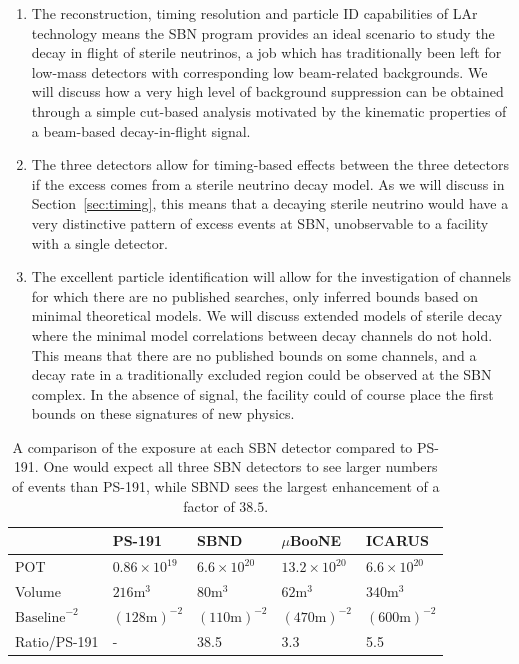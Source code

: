 \documentclass[11pt, a4paper]{article}
\newcommand{\refsec}[1]{Section~\ref{#1}}
\begin{document}
\begin{enumerate}

\item The reconstruction, timing resolution and particle ID capabilities of LAr technology means
the SBN program provides an ideal scenario to study the decay in flight of
sterile neutrinos, a job which has traditionally been left for low-mass
detectors with corresponding low beam-related backgrounds. 
%
We will discuss how a very high level of background suppression can be obtained
through a simple cut-based analysis motivated by the kinematic properties
of a beam-based decay-in-flight signal. 

\item The three detectors allow for timing-based effects between 
the three detectors if the excess comes from a sterile neutrino decay 
model. As we will discuss in \refsec{sec:timing}, this means that a decaying 
sterile neutrino would have a very distinctive pattern of excess events at
SBN, unobservable to a facility with a single detector.

\item The excellent particle identification will allow for the investigation of
channels for which there are no published searches, only inferred bounds based
on minimal theoretical models. We will discuss extended models of sterile decay
where the minimal model correlations between decay channels do not hold. This
means that there are no published bounds on some channels, and a decay rate in
a traditionally excluded region could be observed at the SBN complex. In the
absence of signal, the facility could of course place the first bounds on these
signatures of new physics.

\end{enumerate} 

\begin{table}[t!]
\centering
\begin{tabular}{| l || l | l | l | l |}
	\hline
	& PS-191 & SBND & $\mu$BooNE & ICARUS \\ \hline \hline
	POT	& $0.86 \times 10^{19}$	& $6.6 \times 10^{20}$	&	$13.2 \times 10^{20}$     &  $6.6 \times 10^{20}$ \\ \hline
	Volume	& $216\text{m}^3$	&	$80\text{m}^3$	&	$62\text{m}^3$	     &   $340\text{m}^3$	\\ \hline
	$\text{Baseline}^{-2}$	& $(128 	\text{m} )^{-2}$	&$(110 \text{m} )^{-2}$	&	$(470 \text{m} )^{-2}$			     & $(600 \text{m} )^{-2}$	  \\ \hline
Ratio/PS-191 & - 	& 38.5 	& 3.3	& 5.5\\ \hline
\end{tabular}

\caption{\label{tab:exposure} A comparison of the exposure at each SBN detector compared to PS-191. One would expect all  three SBN detectors to see larger numbers of events than PS-191, while SBND sees the largest enhancement of a factor of $38.5$.}

\end{table}
\end{document}
